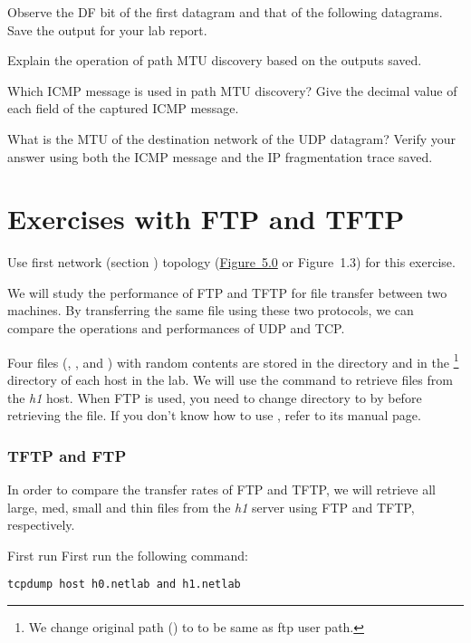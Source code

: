 \documentclass{../UTNetLab}
\begin{document}
Observe the DF bit of the first datagram and that of the following datagrams.
Save the  output for your lab report.

\begin{report}
    \item Explain the operation of path MTU discovery based on the  outputs saved.

    \item Which ICMP message is used in path MTU discovery? Give the decimal value of each field of the captured ICMP message.

    \item What is the MTU of the destination network of the UDP datagram? Verify your answer using both the ICMP message and the IP fragmentation trace saved.
\end{report}

\part{Exercises with FTP and TFTP}
Use first network (section ) topology (\hyperref[fig:5.0]{Figure~5.0} or Figure~1.3) for this exercise.

We will study the performance of FTP and TFTP for file transfer between two machines.
By transferring the same file using these two protocols, we can compare the operations and performances of UDP and TCP.

Four files (, ,  and ) with random contents are stored in the  directory and in the \footnote{We change original path () to  to be same as ftp user path.} directory of each host in the lab.
We will use the  command to retrieve files from the \textit{h1} host.
When FTP is used, you need to change directory to  by  before retrieving the file.
If you don’t know how to use , refer to its manual page.


\section{TFTP and FTP}
In order to compare the transfer rates of FTP and TFTP, we will retrieve all large, med, small and thin files from the \textit{h1} server using FTP and TFTP, respectively.

First run First run the following  command:
\begin{lstlisting}[emph={h0,h1,netlab},morekeywords={[3]host,and}]
tcpdump host h0.netlab and h1.netlab
    \end{lstlisting}
\end{document}
